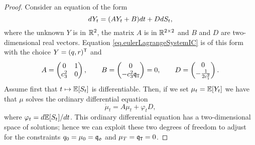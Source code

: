 \documentclass[10pt,a4paper]{article}
\begin{document}
\begin{proof}
		Consider an equation of the form
		\begin{equation*}
		dY_t = (AY_t + B)dt + D dS_t,
		\end{equation*}
		where the unknown $Y$ is in $\mathbb{R}^{2}$, the matrix $A$ is in $\mathbb{R}^{2\times 2}$ and $B$ and $D$ are two-dimensional real vectors. Equation \eqref{eq.eulerLagrangeSystemIC} is of this form with the choice $Y=(q,r)^{\mathsf{T}}$ and
		\begin{equation*}
		A=
		\begin{pmatrix}
		0 & 1 \\ 
		c_{3}^{2} & 0 
		\end{pmatrix}, \qquad
		B= 
		\begin{pmatrix}
		0 \\ -c_{3}^{2} \mathfrak{q}_{\mathtt{T} }
		\end{pmatrix}
		 = 0, \qquad
		D= 
		\begin{pmatrix}
		0 \\ -\frac{1}{2c_{1}^{2}}
		\end{pmatrix}.
		\end{equation*} 
		Assume first that $t\mapsto \mathbb{{E}}[S_t]$ is differentiable. Then, if we set $\mu_t=\mathbb{{E}}[Y_t]$ we have that $\mu$ solves the ordinary differential equation
		\begin{equation}\label{eq.ODEforExpectedInventory}
		\dot{\mu}_t = A\mu_t + \varphi_t D,
		\end{equation}
		where $\varphi_t= d\mathbb{{E}}[S_t]/dt$. This ordinary differential equation has a two-dimensional space of solutions; hence we can exploit these two degrees of freedom to adjust for the constraints $q_0 = \mu_0 = \mathfrak{q_0}$ and $\mu_T  = \mathfrak{q}_{\mathtt{T} } = 0$. 
		

\end{proof}
\end{document}

